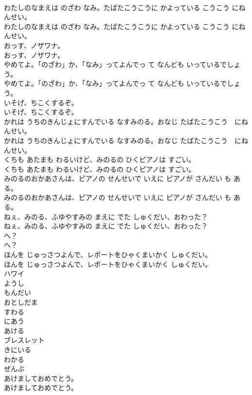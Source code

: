 \documentclass[8pt]{extreport}
\begin{document}
\begin{CJK}{UTF8}{min}
\\	わたしのなまえは のざわ なみ。たばたこうこうに かよっている こうこう にねんせい。
\\	わたしのなまえは のざわ なみ。たばたこうこうに かよっている こうこう にねんせい。
\\	おっす、ノザワナ。
\\	おっす、ノザワナ。
\\	やめてよ。「のざわ」か、「なみ」ってよんでっ て なんども いっているでしょう。
\\	やめてよ。「のざわ」か、「なみ」ってよんでっ て なんども いっているでしょう。
\\	いそげ、ちこくするぞ。
\\	いそげ、ちこくするぞ。
\\	かれは うちのきんじょにすんでいる なすみのる。おなじ たばたこうこう　にねんせい。
\\	かれは うちのきんじょにすんでいる なすみのる。おなじ たばたこうこう　にねんせい。
\\	くちも あたまも わるいけど、みのるの ひくピアノは すごい。
\\	くちも あたまも わるいけど、みのるの ひくピアノは すごい。
\\	みのるのおかあさんは、ピアノの せんせいで いえに ピアノが さんだい も ある。
\\	みのるのおかあさんは、ピアノの せんせいで いえに ピアノが さんだい も ある。
\\	ねぇ、みのる、ふゆやすみの まえに でた しゅくだい、おわった？
\\	ねぇ、みのる、ふゆやすみの まえに でた しゅくだい、おわった？
\\	へ？
\\	へ？
\\	ほんを じゅっさつよんで、レポートをひゃくまいかく しゅくだい。
\\	ほんを じゅっさつよんで、レポートをひゃくまいかく しゅくだい。
\\	ハワイ
\\	ようし
\\	もんだい
\\	おとしだま
\\	すわる
\\	にあう
\\	あける
\\	ブレスレット
\\	きにいる
\\	わかる
\\	ぜんぶ
\\	あけましておめでとう。
\\	あけましておめでとう。

\end{CJK}
\end{document}
